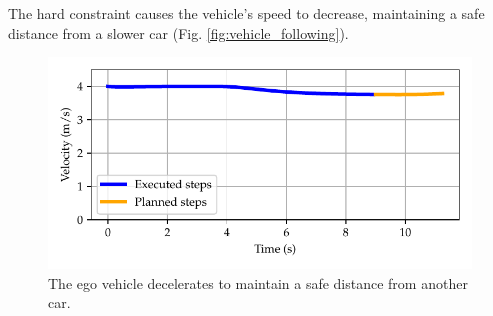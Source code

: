 \documentclass[letterpaper, 10 pt, conference]{ieeeconf}  %
\begin{document}
The hard constraint causes the vehicle's speed to decrease, maintaining a safe distance from a slower car (Fig. \ref{fig:vehicle_following}).
 
 \begin{figure}[h!]
	\centering
	\includegraphics[width=0.9\linewidth]{figures/vehicle_following_velocity.pdf}
	 	\vspace{-1em}
	\caption{The ego vehicle decelerates to maintain a safe distance from another car.}
	\vspace{-1em}
	\label{fig:vehicle_following_velocity}
\end{figure}
\end{document}
